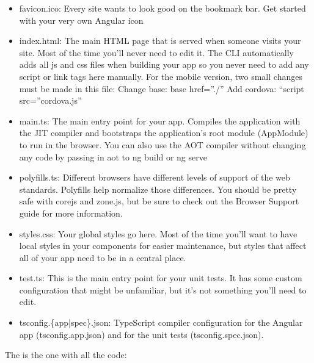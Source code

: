 \documentclass[letterpaper,10pt,english]{sphinxmanual}
\begin{document}
\begin{itemize}
\item {} 
favicon.ico: Every site wants to look good on the bookmark bar. Get started with your very own Angular icon

\item {} 
index.html: The main HTML page that is served when someone visits your site. Most of the time you’ll never need to edit it. The CLI automatically adds all js and css files when building your app so you never need to add any script or link tags here manually. For the mobile version, two small changes must be made in this file:
Change base: base href=”./”
Add cordova:  “script src=”cordova.js”

\item {} 
main.ts: The main entry point for your app. Compiles the application with the JIT compiler and bootstraps the application’s root module (AppModule) to run in the browser. You can also use the AOT compiler without changing any code by passing in \textendash{}aot to ng build or ng serve

\item {} 
polyfills.ts: Different browsers have different levels of support of the web standards. Polyfills help normalize those differences. You should be pretty safe with core\sphinxhyphen{}js and zone.js, but be sure to check out the Browser Support guide for more information.

\item {} 
styles.css: Your global styles go here. Most of the time you’ll want to have local styles in your components for easier maintenance, but styles that affect all of your app need to be in a central place.

\item {} 
test.ts: This is the main entry point for your unit tests. It has some custom configuration that might be unfamiliar, but it’s not something you’ll need to edit.

\item {} 
tsconfig.\{app|spec\}.json: TypeScript compiler configuration for the Angular app (tsconfig.app.json) and for the unit tests (tsconfig.spec.json).

\end{itemize}

The  is the one with all the code:
\end{document}
